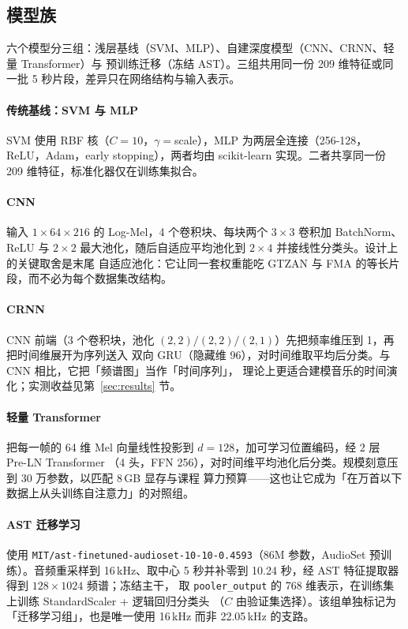 \documentclass[UTF8,10pt,a4paper]{ctexart}
\begin{document}
\subsection{模型族}

六个模型分三组：浅层基线（SVM、MLP）、自建深度模型（CNN、CRNN、轻量 Transformer）与
预训练迁移（冻结 AST）。三组共用同一份 209 维特征或同一批 5 秒片段，差异只在网络结构与输入表示。

\paragraph{传统基线：SVM 与 MLP}
SVM 使用 RBF 核（$C=10$，$\gamma=$scale），MLP 为两层全连接（256-128，ReLU，Adam，early stopping），两者均由 scikit-learn\cite{pedregosa2011sklearn} 实现。二者共享同一份 209 维特征，标准化器仅在训练集拟合。

\paragraph{CNN}
输入 $1\times64\times216$ 的 Log-Mel，4 个卷积块、每块两个 $3\times3$ 卷积加 BatchNorm、ReLU 与
$2\times2$ 最大池化，随后自适应平均池化到 $2\times4$ 并接线性分类头。设计上的关键取舍是末尾
自适应池化：它让同一套权重能吃 GTZAN 与 FMA 的等长片段，而不必为每个数据集改结构。

\paragraph{CRNN}
CNN 前端（3 个卷积块，池化 $(2,2)/(2,2)/(2,1)$）先把频率维压到 1，再把时间维展开为序列送入
双向 GRU（隐藏维 96），对时间维取平均后分类。与 CNN 相比，它把「频谱图」当作「时间序列」，
理论上更适合建模音乐的时间演化；实测收益见第~\ref{sec:results} 节。

\paragraph{轻量 Transformer}
把每一帧的 64 维 Mel 向量线性投影到 $d=128$，加可学习位置编码，经 2 层 Pre-LN Transformer
（4 头，FFN 256），对时间维平均池化后分类。规模刻意压到 30 万参数，以匹配 8\,GB 显存与课程
算力预算——这也让它成为「在万首以下数据上从头训练自注意力」的对照组。

\paragraph{AST 迁移学习}
使用 \texttt{MIT/ast-finetuned-audioset-10-10-0.4593}（86M 参数，AudioSet 预训练）。音频重采样到
16\,kHz、取中心 5 秒并补零到 10.24 秒，经 AST 特征提取器得到 $128\times1024$ 频谱；冻结主干，
取 \texttt{pooler\_output} 的 768 维表示，在训练集上训练 StandardScaler + 逻辑回归分类头
（$C$ 由验证集选择）。该组单独标记为「迁移学习组」，也是唯一使用 16\,kHz 而非 22.05\,kHz 的支路。
\end{document}
